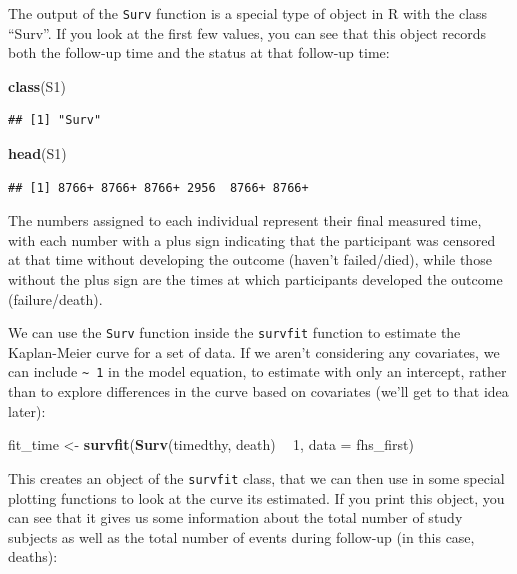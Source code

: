 \documentclass[
]{book}
\newenvironment{Shaded}{\begin{snugshade}}{\end{snugshade}}
\newcommand{\DataTypeTok}[1]{\textcolor[rgb]{0.13,0.29,0.53}{#1}}
\newcommand{\DecValTok}[1]{\textcolor[rgb]{0.00,0.00,0.81}{#1}}
\newcommand{\KeywordTok}[1]{\textcolor[rgb]{0.13,0.29,0.53}{\textbf{#1}}}
\newcommand{\NormalTok}[1]{#1}
\newcommand{\OperatorTok}[1]{\textcolor[rgb]{0.81,0.36,0.00}{\textbf{#1}}}
\newcommand{\StringTok}[1]{\textcolor[rgb]{0.31,0.60,0.02}{#1}}
\begin{document}
The output of the \texttt{Surv} function is a special type of object in R with the class ``Surv''. If you look at the first few values, you can see that this object records both the follow-up time and the status at that follow-up time:

\begin{Shaded}
\begin{Highlighting}[]
\KeywordTok{class}\NormalTok{(S1)}
\end{Highlighting}
\end{Shaded}

\begin{verbatim}
## [1] "Surv"
\end{verbatim}

\begin{Shaded}
\begin{Highlighting}[]
\KeywordTok{head}\NormalTok{(S1)}
\end{Highlighting}
\end{Shaded}

\begin{verbatim}
## [1] 8766+ 8766+ 8766+ 2956  8766+ 8766+
\end{verbatim}

The numbers assigned to each individual represent their final measured time, with each number with a plus sign indicating that the participant was censored at that time without developing the outcome (haven't failed/died), while those without the plus sign are the times at which participants developed the outcome (failure/death).

We can use the \texttt{Surv} function inside the \texttt{survfit} function to estimate the Kaplan-Meier curve for a set of data. If we aren't considering any covariates, we can include \texttt{\textasciitilde{}\ 1} in the model equation, to estimate with only an intercept, rather than to explore differences in the curve based on covariates (we'll get to that idea later):

\begin{Shaded}
\begin{Highlighting}[]
\NormalTok{fit_time <-}\StringTok{ }\KeywordTok{survfit}\NormalTok{(}\KeywordTok{Surv}\NormalTok{(timedthy, death) }\OperatorTok{~}\StringTok{ }\DecValTok{1}\NormalTok{, }\DataTypeTok{data =}\NormalTok{ fhs_first)}
\end{Highlighting}
\end{Shaded}

This creates an object of the \texttt{survfit} class, that we can then use in some special plotting functions to look at the curve its estimated. If you print this object, you can see that it gives us some information about the total number of study subjects as well as the total number of events during follow-up (in this case, deaths):
\end{document}

